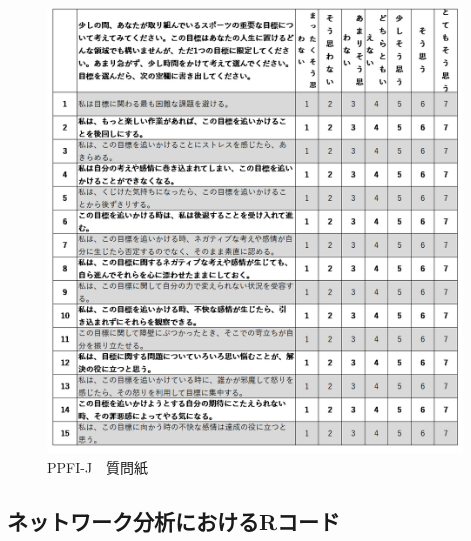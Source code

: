 \documentclass[12pt,a4paper,xelatex,ja=standard]{bxjsarticle}
\begin{document}
\begin{figure}[H]
\centering
\includegraphics[clip,width = 11cm]{question/ppfiq.png}
\caption{PPFI-J　質問紙}
\end{figure}

\clearpage

\hypertarget{ux30cdux30c3ux30c8ux30efux30fcux30afux5206ux6790ux306bux304aux3051ux308brux30b3ux30fcux30c9}{%
\subsection{ネットワーク分析におけるRコード}\label{ux30cdux30c3ux30c8ux30efux30fcux30afux5206ux6790ux306bux304aux3051ux308brux30b3ux30fcux30c9}}
\end{document}
